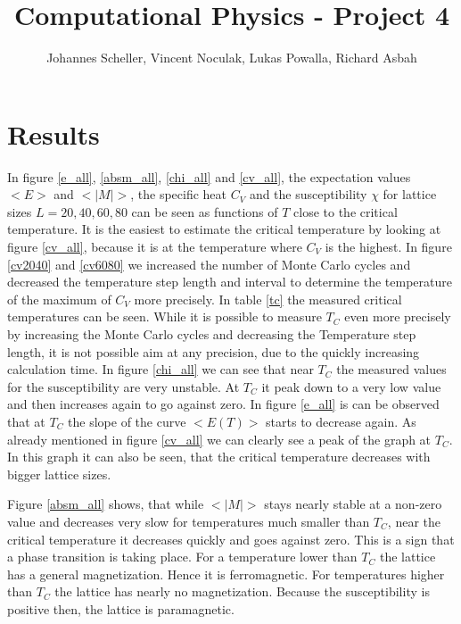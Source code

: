 \documentclass[10pt,a4paper]{article}
\author{Johannes Scheller, Vincent Noculak, Lukas Powalla, Richard Asbah}
\title{Computational Physics - Project 4}
\begin{document}
\maketitle
\newpage
\tableofcontents
\newpage


\section{Results}


In figure \ref{e_all}, \ref{absm_all}, \ref{chi_all} and \ref{cv_all}, the expectation values $<E>$ and $<|M|>$, the specific heat $C_V$ and the susceptibility $\chi$ for lattice sizes $L = 20, 40, 60, 80$ can be seen as functions of $T$ close to the critical temperature. It is the easiest to estimate the critical temperature by looking at figure \ref{cv_all}, because it is at the temperature where $C_V$ is the highest. In figure \ref{cv2040} and \ref{cv6080} we increased the number of Monte Carlo cycles and decreased the temperature step length and interval to determine the temperature of the maximum of $C_V$ more precisely. In table \ref{tc} the measured critical temperatures can be seen. While it is possible to measure $T_C$ even more precisely by increasing the Monte Carlo cycles and decreasing the Temperature step length, it is not possible aim at any precision, due to the quickly increasing calculation time. 
In figure \ref{chi_all} we can see that near $T_C$ the measured values for the susceptibility are very unstable. At $T_C$ it peak down to a very low value and then increases again to go against zero. In figure \ref{e_all} is can be observed that at $T_C$ the slope of the curve $<E(T)>$ starts to decrease again. As already mentioned in figure \ref{cv_all} we can clearly see a peak of the graph at $T_C$. In this graph it can also be seen, that the critical temperature decreases with bigger lattice sizes. 

Figure \ref{absm_all} shows, that while $<|M|>$ stays nearly stable at a non-zero value and decreases very slow for temperatures much smaller than $T_C$, near the critical temperature it decreases quickly and goes against zero. This is a sign that a phase transition is taking place. For a temperature lower than $T_C$ the lattice has a general magnetization. Hence it is ferromagnetic. For temperatures higher than $T_C$ the lattice has nearly no magnetization. Because the susceptibility is positive then, the  lattice is paramagnetic.
\end{document}
